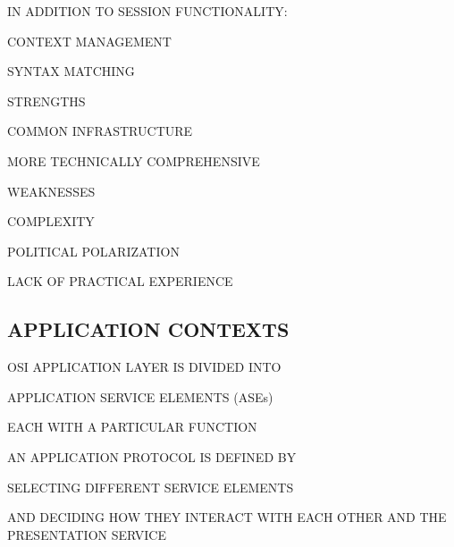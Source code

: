 \begin{bwslide}

\begin{nrtc}
\item	IN ADDITION TO SESSION FUNCTIONALITY:
    \begin{nrtc}
    \item	CONTEXT MANAGEMENT

    \item	SYNTAX MATCHING
    \end{nrtc}
\end{nrtc}
\end{bwslide}


\begin{bwslide}

\begin{nrtc}
\item	STRENGTHS
    \begin{nrtc}
    \item	COMMON INFRASTRUCTURE

    \item	MORE TECHNICALLY COMPREHENSIVE
    \end{nrtc}

\item	WEAKNESSES
    \begin{nrtc}
    \item	COMPLEXITY

    \item	POLITICAL POLARIZATION

    \item	LACK OF PRACTICAL EXPERIENCE
    \end{nrtc}
\end{nrtc}
\end{bwslide}


\begin{bwslide}
\part*	{APPLICATION CONTEXTS}\bf

\begin{nrtc}
\item	OSI APPLICATION LAYER IS DIVIDED INTO
    \begin{nrtc}
    \item	APPLICATION SERVICE ELEMENTS (ASEs)
    \end{nrtc}
	EACH WITH A PARTICULAR FUNCTION

\item	AN APPLICATION PROTOCOL IS DEFINED BY
    \begin{nrtc}
    \item	SELECTING DIFFERENT SERVICE ELEMENTS

    \item	AND DECIDING HOW THEY INTERACT WITH EACH OTHER AND THE
		PRESENTATION SERVICE 
    \end{nrtc}
\end{nrtc}
\end{bwslide}


